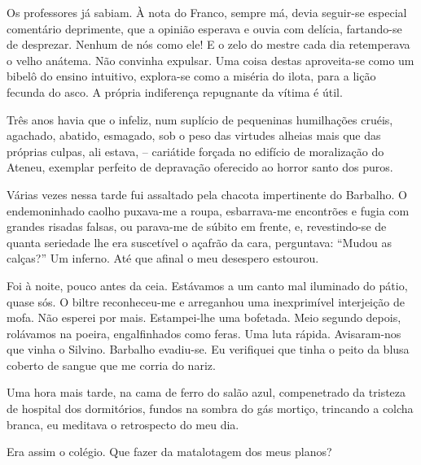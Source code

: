 Os professores já sabiam. À nota do Franco, sempre má, devia seguir{}-se 
especial comentário deprimente, que a opinião esperava e ouvia com delícia,
fartando{}-se de desprezar. Nenhum de nós como ele! E o zelo do mestre
cada dia retemperava o velho anátema. Não convinha expulsar. Uma coisa
destas aproveita{}-se como um bibelô do ensino intuitivo, explora{}-se
como a miséria do ilota, para a lição fecunda do asco. A própria
indiferença repugnante da vítima é útil. 

Três anos havia que o infeliz,
num suplício de pequeninas humilhações cruéis, agachado, abatido,
esmagado, sob o peso das virtudes alheias mais que das próprias culpas,
ali estava, -- cariátide forçada no edifício de moralização do Ateneu,
exemplar perfeito de depravação oferecido ao horror santo dos puros.

Várias vezes nessa tarde fui assaltado pela chacota impertinente do
Barbalho. O endemoninhado caolho puxava{}-me a roupa, esbarrava{}-me
encontrões e fugia com grandes risadas falsas, ou parava{}-me de súbito em
frente, e, revestindo{}-se de quanta seriedade lhe era suscetível o
açafrão da cara, perguntava: ``Mudou as calças?'' Um inferno. Até que
afinal o meu desespero estourou. 

Foi à noite, pouco antes da ceia.
Estávamos a um canto mal iluminado do pátio, quase sós. O biltre
reconheceu{}-me e arreganhou uma inexprimível interjeição de mofa. Não
esperei por mais. Estampei{}-lhe uma bofetada. Meio segundo depois,
rolávamos na poeira, engalfinhados como feras. Uma luta rápida.
Avisaram{}-nos que vinha o Silvino. Barbalho evadiu{}-se. Eu verifiquei
que tinha o peito da blusa coberto de sangue que me corria do nariz. 

Uma hora mais tarde, na cama de ferro do salão azul, compenetrado da tristeza de 
hospital dos dormitórios, fundos na sombra do gás mortiço, trincando a colcha
branca, eu meditava o retrospecto do meu dia. 

Era assim o colégio. Que fazer da matalotagem dos meus planos? 

